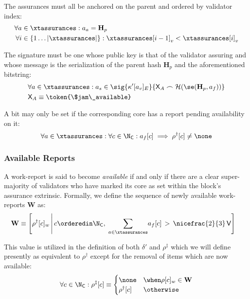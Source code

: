 The assurances must all be anchored on the parent and ordered by validator index:
\begin{align}
  \forall a &\in \xtassurances : a_a = \mathbf{H}_p \\
  \forall i &\in \{ 1\dots|\xtassurances| \} : \xtassurances[i - 1]_v < \xtassurances[i]_v
\end{align}

The signature must be one whose public key is that of the validator assuring and whose message is the serialization of the parent hash $\mathbf{H}_p$ and the aforementioned bitstring:
\begin{align}
  &\forall a \in \xtassurances : a_s \in \sig{\kappa'[a_v]_E}{\mathsf{X}_A\frown \mathcal{H}(\se(\mathbf{H}_p, a_f))} \\
  &\mathsf{X}_A \equiv \token{\$jam\_available}
\end{align}

A bit may only be set if the corresponding core has a report pending availability on it:
\begin{align}
  \forall a \in \xtassurances : \forall c \in \N_\mathsf{C} : a_f[c] \implies \rho^\dagger[c] \ne \none
\end{align}

\subsubsection{Available Reports}
A work-report is said to become \emph{available} if and only if there are a clear  super-majority of validators who have marked its core as set within the block's assurance extrinsic. Formally, we define the sequence of newly available work-reports $\mathbf{W}$ as:
\begin{align}\label{eq:availableworkreports}
  \mathbf{W} &\equiv \left[\rho^\dagger[c]_w\,\middle\vert\,c \orderedin \N_\mathsf{C},\;\sum_{a \in \xtassurances}\!a_f[c]\,>\,\nicefrac{2}{3}\,\mathsf{V}\right]
\end{align}

This value is utilized in the definition of both $\delta'$ and $\rho^\ddagger$ which we will define presently as equivalent to $\rho^\dagger$ except for the removal of items which are now available:
\begin{align}
  \forall c \in \N_\mathsf{C}: \rho^\ddagger[c] \equiv \begin{cases}
    \none &\when\rho[c]_w \in \mathbf{W}\\
    \rho^\dagger[c] &\otherwise
  \end{cases}
\end{align}











